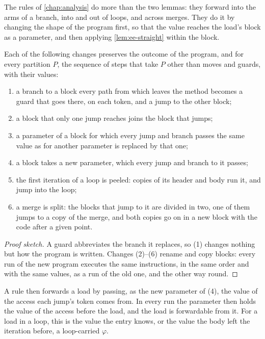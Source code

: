 The rules of \cref{chap:analysis} do more than the two lemmas: they forward
into the arms of a branch, into and out of loops, and across merges. They do it
by changing the shape of the program first, so that the value reaches the
load's block as a parameter, and then applying \cref{lem:ee-straight} within the
block.

\begin{lemma}[Shapes]\label{lem:ee-shapes}
Each of the following changes preserves the outcome of the program, and for
every partition $P$, the sequence of steps that take $P$ other than moves and
guards, with their values:
\begin{enumerate}
\item a branch to a block every path from which leaves the method becomes a
  guard that goes there, on each token, and a jump to the other block;
\item a block that only one jump reaches joins the block that jumps;
\item a parameter of a block for which every jump and branch passes the same
  value as for another parameter is replaced by that one;
\item a block takes a new parameter, which every jump and branch to it passes;
\item the first iteration of a loop is peeled: copies of its header and body run
  it, and jump into the loop;
\item a merge is split: the blocks that jump to it are divided in two, one of
  them jumps to a copy of the merge, and both copies go on in a new block with
  the code after a given point.
\end{enumerate}
\end{lemma}

\begin{proof}[Proof sketch]
A guard abbreviates the branch it replaces, so (1) changes nothing but how the
program is written. Changes (2)--(6) rename and copy blocks: every run of the
new program executes the same instructions, in the same order and with the same
values, as a run of the old one, and the other way round.
\end{proof}

A rule then forwards a load by passing, as the new parameter of (4), the value
of the access each jump's token comes from. In every run the parameter then
holds the value of the access before the load, and the load is forwardable from
it. For a load in a loop, this is the value the entry knows, or the value the
body left the iteration before, a loop-carried $\varphi$.

